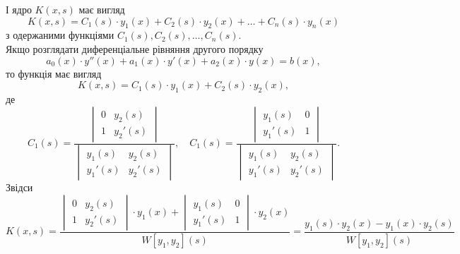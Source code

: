 І ядро $K(x, s)$ має вигляд
\begin{equation*}
	K(x, s) = C_1(s) \cdot y_1(x) + C_2(s) \cdot y_2(x) + \ldots + C_n(s) \cdot y_n(x)
\end{equation*}
з одержаними функціями $C_1(s), C_2(s), \ldots, C_n(s)$. \\

Якщо розглядати диференціальне рівняння другого порядку 
\begin{equation*}
	a_0(x) \cdot y''(x) + a_1(x) \cdot y'(x) + a_2(x) \cdot y(x) = b(x),
\end{equation*}
то функція  має вигляд
\begin{equation*}
	K(x, s) = C_1(s) \cdot y_1(x) + C_2(s) \cdot y_2(x),
\end{equation*}
де
\begin{equation*}
	C_1(s) = \frac{\begin{vmatrix} 0 & y_2(s) \\ 1 & y_2'(s) \end{vmatrix}}{\begin{vmatrix} y_1(s) & y_2(s) \\ y_1'(s) & y_2'(s) \end{vmatrix}}, \quad C_1(s) = \frac{\begin{vmatrix} y_1(s) & 0 \\ y_1'(s) & 1 \end{vmatrix}}{\begin{vmatrix} y_1(s) & y_2(s) \\ y_1'(s) & y_2'(s) \end{vmatrix}}.
\end{equation*}
Звідси
\begin{equation*}
	K(x, s) = \frac{\begin{vmatrix} 0 & y_2(s) \\ 1 & y_2'(s) \end{vmatrix} \cdot y_1(x) + \begin{vmatrix} y_1(s) & 0 \\ y_1'(s) & 1 \end{vmatrix} \cdot y_2(x) }{W[y_1, y_2](s)} = \frac{y_1(s) \cdot y_2(x) - y_1(x) \cdot y_2(s)}{W[y_1, y_2](s)}
\end{equation*}
